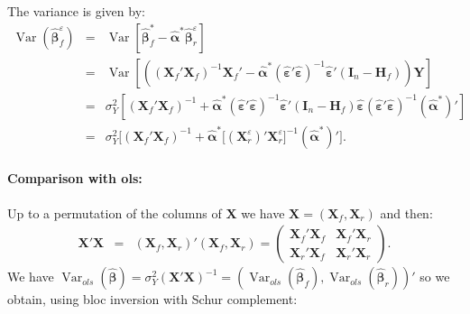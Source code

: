 \documentclass[12pt,a4paper]{report}
\begin{document}
The variance is given by:
	\begin{eqnarray}
		\operatorname{Var}(\hat{\boldsymbol{\beta}}_f^{\varepsilon})&=&\operatorname{Var}[\hat{\boldsymbol{\beta}}^*_f-\hat{\boldsymbol{\alpha}}^*\hat{\boldsymbol{\beta}}_{r}^{\varepsilon}] \nonumber \\
		&=&\operatorname{Var}\left[\left((\boldsymbol{X}_f'\boldsymbol{X}_f)^{-1}\boldsymbol{X}_f'-\hat{\boldsymbol{\alpha}}^*(\hat{\boldsymbol{\varepsilon}}'\hat{\boldsymbol{\varepsilon}})^{-1}\hat{\boldsymbol{\varepsilon}}'(\boldsymbol{I}_n-\boldsymbol{H}_f)\right)\boldsymbol{Y}\right]  \nonumber \\
		&=&\sigma_Y^2[(\boldsymbol{X}_f'\boldsymbol{X}_f)^{-1}+\hat{\boldsymbol{\alpha}}^*(\hat{\boldsymbol{\varepsilon}}'\hat{\boldsymbol{\varepsilon}})^{-1}\hat{\boldsymbol{\varepsilon}}'(\boldsymbol{I}_n-\boldsymbol{H}_f)\hat{\boldsymbol{\varepsilon}}(\hat{\boldsymbol{\varepsilon}}'\hat{\boldsymbol{\varepsilon}})^{-1}(\hat{\boldsymbol{\alpha}}^*)'] \nonumber \\
		&=&\sigma_Y^2\big[(\boldsymbol{X}_f'\boldsymbol{X}_f)^{-1}+\hat{\boldsymbol{\alpha}}^*\big[(\boldsymbol{X}_r^{\varepsilon})'\boldsymbol{X}_r^{\varepsilon}\big]^{-1}(\hat{\boldsymbol{\alpha}}^*)'\big]. \label{varpluginf}
	\end{eqnarray}

\paragraph{Comparison with {\sc ols}:}
Up to a permutation of the columns of $\boldsymbol{X}$ we have $\boldsymbol{X}=(\boldsymbol{X}_f,\boldsymbol{X}_r)$ and then:
\begin{eqnarray*}
	\boldsymbol{X}'\boldsymbol{X}&=&(\boldsymbol{X}_f,\boldsymbol{X}_r)'(\boldsymbol{X}_f,\boldsymbol{X}_r)=\left( 
	\begin{array}{cc}
	 \boldsymbol{X}_f'\boldsymbol{X}_f & \boldsymbol{X}_f'\boldsymbol{X}_r \\ 
	\boldsymbol{X}_r'\boldsymbol{X}_f & \boldsymbol{X}_r'\boldsymbol{X}_r
	\end{array} 
	\right).
\end{eqnarray*}
We have $\operatorname{Var}_{ols}(\hat{\boldsymbol{\beta}})=\sigma_Y^2(\boldsymbol{X}'\boldsymbol{X})^{-1}=(\operatorname{Var}_{ols}(\hat{\boldsymbol{\beta}}_{f}),\operatorname{Var}_{ols}(\hat{\boldsymbol{\beta}}_{r}))'$ so we obtain, using bloc inversion with Schur complement:
\end{document}
